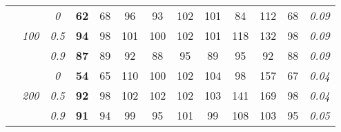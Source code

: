 \begin{table}
\begin{center}
\begin{tabular}{ccc|cc|cc|cc|cc|c|c}
\cline{2-3}\rule{0pt}{3ex}
& & \it  0  & {\bf 62} & 68 & 96 & 93 & 102 & 101 & 84 & 112 & 68 & \it  0.09 \\
 & \it  100  & \it  0.5  & {\bf 94} & 98 & 101 & 100 & 102 & 101 & 118 & 132 & 98 & \it  0.09 \\
& & \it  0.9  & {\bf 87} & 89 & 92 & 88 & 95 & 89 & 95 & 92 & 88 & \it  0.09 \\[1ex]
\cline{2-3}\rule{0pt}{3ex}
& & \it  0  & {\bf 54} & 65 & 110 & 100 & 102 & 104 & 98 & 157 & 67 & \it  0.04 \\
 & \it  200  & \it  0.5  & {\bf 92} & 98 & 102 & 102 & 102 & 103 & 141 & 169 & 98 & \it  0.04 \\
& & \it  0.9  & {\bf 91} & 94 & 99 & 95 & 101 & 99 & 108 & 103 & 95 & \it  0.05 \\
\hline\end{tabular}
\end{center}
\end{table}




